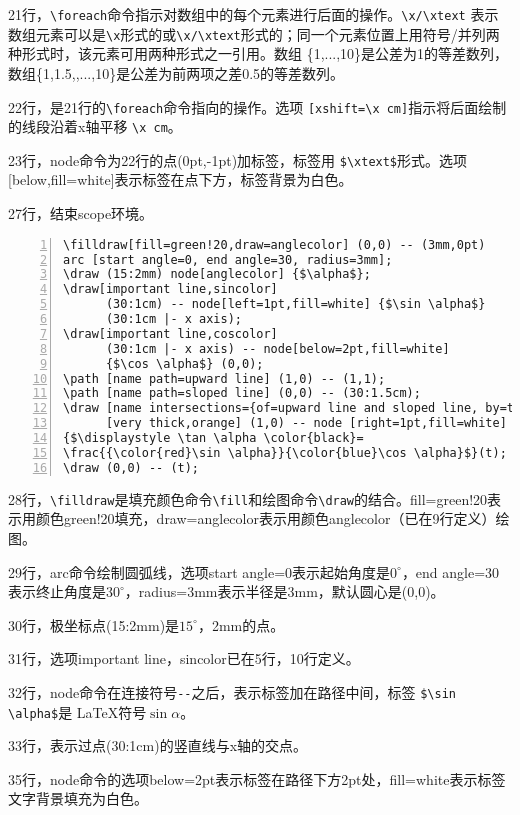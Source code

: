 \documentclass[UTF8]{ctexart}
\begin{document}
21行，\verb!\foreach!命令指示对数组中的每个元素进行后面的操作。\verb!\x/\xtext!
表示数组元素可以是\verb!\x!形式的或\verb!\x/\xtext!形式的；同一个元素位置上用符号/并列两种形式时，该元素可用两种形式之一引用。数组 \{1,...,10\}是公差为1的等差数列，数组\{1,1.5,,...,10\}是公差为前两项之差0.5的等差数列。

22行，是21行的\verb!\foreach!命令指向的操作。选项 \verb![xshift=\x cm]!指示将后面绘制的线段沿着x轴平移 \verb!\x cm!。

23行，node命令为22行的点(0pt,-1pt)加标签，标签用 \verb!$\xtext$!形式。选项[below,fill=white]表示标签在点下方，标签背景为白色。

27行，结束scope环境。

\begin{lstlisting}[name=example-1,numbers=left,    numberstyle=\footnotesize]
\filldraw[fill=green!20,draw=anglecolor] (0,0) -- (3mm,0pt)
arc [start angle=0, end angle=30, radius=3mm];
\draw (15:2mm) node[anglecolor] {$\alpha$};
\draw[important line,sincolor]
      (30:1cm) -- node[left=1pt,fill=white] {$\sin \alpha$} 
      (30:1cm |- x axis);
\draw[important line,coscolor]
      (30:1cm |- x axis) -- node[below=2pt,fill=white] 
      {$\cos \alpha$} (0,0);
\path [name path=upward line] (1,0) -- (1,1);
\path [name path=sloped line] (0,0) -- (30:1.5cm);
\draw [name intersections={of=upward line and sloped line, by=t}]
      [very thick,orange] (1,0) -- node [right=1pt,fill=white]
{$\displaystyle \tan \alpha \color{black}=
\frac{{\color{red}\sin \alpha}}{\color{blue}\cos \alpha}$}(t);
\draw (0,0) -- (t);
\end{lstlisting}

28行，\verb!\filldraw!是填充颜色命令\verb!\fill!和绘图命令\verb!\draw!的结合。fill=green!20表示用颜色green!20填充，draw=anglecolor表示用颜色anglecolor（已在9行定义）绘图。

29行，arc命令绘制圆弧线，选项start angle=0表示起始角度是$0^{\circ}$，end angle=30表示终止角度是$30^{\circ}$，radius=3mm表示半径是3mm，默认圆心是(0,0)。

30行，极坐标点(15:2mm)是$15^{\circ}$，2mm的点。

31行，选项important line，sincolor已在5行，10行定义。

32行，node命令在连接符号\verb!--!之后，表示标签加在路径中间，标签 \verb!$\sin \alpha$!是 \LaTeX 符号$\sin \alpha$。

33行，表示过点(30:1cm)的竖直线与x轴的交点。

35行，node命令的选项below=2pt表示标签在路径下方2pt处，fill=white表示标签文字背景填充为白色。
\end{document}
